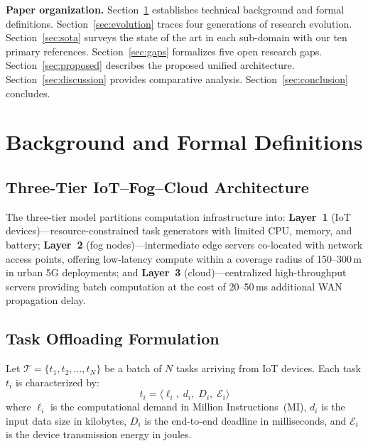 \documentclass[12pt,a4paper]{article}
\begin{document}
\textbf{Paper organization.}
Section~\ref{sec:background} establishes technical background and formal
definitions. Section~\ref{sec:evolution} traces four generations of research
evolution. Section~\ref{sec:sota} surveys the state of the art in each
sub-domain with our ten primary references. Section~\ref{sec:gaps} formalizes
five open research gaps. Section~\ref{sec:proposed} describes the proposed
unified architecture. Section~\ref{sec:discussion} provides comparative
analysis. Section~\ref{sec:conclusion} concludes.


\section{Background and Formal Definitions}
\label{sec:background}

\subsection{Three-Tier IoT--Fog--Cloud Architecture}

The three-tier model partitions computation infrastructure into:
\textbf{Layer~1} (IoT devices)---resource-constrained task generators with limited
CPU, memory, and battery;
\textbf{Layer~2} (fog nodes)---intermediate edge servers co-located with network
access points, offering low-latency compute within a coverage radius of 150--300\,m
in urban 5G deployments; and
\textbf{Layer~3} (cloud)---centralized high-throughput servers providing batch
computation at the cost of 20--50\,ms additional WAN propagation delay.

\subsection{Task Offloading Formulation}

Let $\mathcal{T} = \{t_1, t_2, \ldots, t_N\}$ be a batch of $N$ tasks arriving
from IoT devices. Each task $t_i$ is characterized by:
\begin{equation}
  t_i = \langle \ell_i,\; d_i,\; D_i,\; \mathcal{E}_i \rangle
\end{equation}
where $\ell_i$ is the computational demand in Million Instructions~(MI), $d_i$
is the input data size in kilobytes, $D_i$ is the end-to-end deadline in
milliseconds, and $\mathcal{E}_i$ is the device transmission energy in joules.
\end{document}
